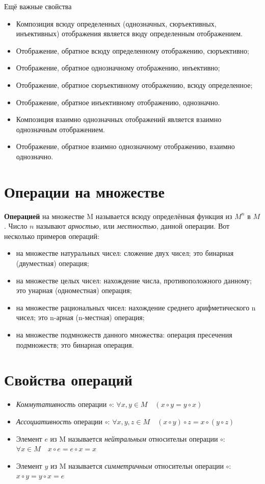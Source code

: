 \documentclass[a4paper]{article}
\begin{document}
{\begin{small}
Ещё важные свойства \begin{itemize}
\item Композиция всюду определенных (однозначных, сюръективных, инъективных) отображения является вюду определенным отображением.
\item Отображение, обратное всюду определенному отображению, сюръективно;
\item Отображение, обратное однозначному отображению, инъективно;
\item Отображение, обратное сюръективному отображению, всюду определенное;
\item Отображение, обратное инъективному отображению, однозначно.
\item Композиция взаимно однозначных отображений является взаимно однозначным отображением.
\item Отображение, обратное взаимно однозначному отображению, взаимно однозначно.
\end{itemize}

\section*{Операции на множестве}
\textbf{Операцией} на множестве M называется всюду
определённая функция из $M^n$ в $M$. Число $n$ называют \textit{арностью}, или
\textit{местностью}, данной операции.
Вот несколько примеров операций:
\begin{itemize}
\item на множестве натуральных чисел: сложение двух чисел; это бинарная
(двуместная) операция;
\item на множестве целых чисел: нахождение числа, противоположного
данному; это унарная (одноместная) операция;
\item на множестве рациональных чисел: нахождение среднего арифметического
n чисел; это n-арная (n-местная) операция;
\item на множестве подмножеств данного множества: операция пресечения
подмножеств; это бинарная операция.
\end{itemize}

\section*{Свойства операций}
\begin{itemize}
\item \textit{Коммутативность} операции $\circ$: $\forall x, y \in M \quad (x \circ y = y \circ x)$
\item \textit{Ассоциативность} операции $\circ$: $\forall x, y, z \in M \quad (x \circ y) \circ z = x \circ (y \circ z)$
\item Элемент $e$ из M называется \textit{нейтральным} относительн операции $\circ$: $\forall x \in M \quad x \circ e = e \circ x = x$
\item Элемент $y$ из M называется \textit{симметричным} относительн операции $\circ$: $x \circ y = y \circ x = e$
\end{itemize}


\end{small}}
\end{document}
